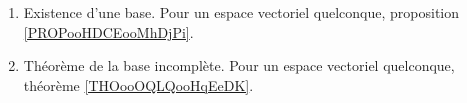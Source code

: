 
\begin{enumerate}
    \item
        Existence d'une base. Pour un espace vectoriel quelconque, proposition \ref{PROPooHDCEooMhDjPi}.
    \item
        Théorème de la base incomplète. Pour un espace vectoriel quelconque, théorème \ref{THOooOQLQooHqEeDK}.
\end{enumerate}
